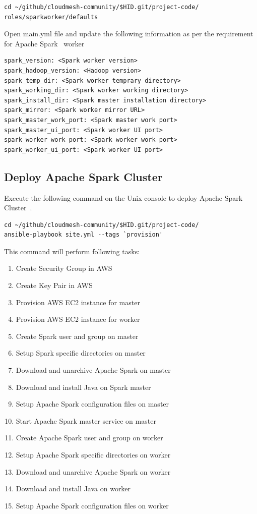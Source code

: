 \begin{verbatim}
cd ~/github/cloudmesh-community/$HID.git/project-code/
roles/sparkworker/defaults
\end{verbatim}

Open main.yml file and update the following information as per the
requirement for Apache Spark~\cite{hid-sp18-511-www-spark} worker

\begin{verbatim}
spark_version: <Spark worker version>
spark_hadoop_version: <Hadoop version>
spark_temp_dir: <Spark worker temprary directory>
spark_working_dir: <Spark worker working directory>
spark_install_dir: <Spark master installation directory>
spark_mirror: <Spark worker mirror URL>
spark_master_work_port: <Spark master work port>
spark_master_ui_port: <Spark worker UI port>
spark_worker_work_port: <Spark worker work port>
spark_worker_ui_port: <Spark worker UI port>
\end{verbatim}

\subsection{Deploy Apache Spark Cluster}\label{s:cluster-deployment}

Execute the following command on the Unix console to deploy Apache
Spark Cluster~\cite{hid-sp18-511-www-spark}.

\begin{verbatim}
cd ~/github/cloudmesh-community/$HID.git/project-code/
ansible-playbook site.yml --tags `provision'
\end{verbatim}

This command will perform following tasks:

\begin{enumerate}
	\item Create Security Group in AWS
	\item Create Key Pair in AWS
	\item Provision AWS EC2 instance for master
	\item Provision AWS EC2 instance for worker
	\item Create Spark user and group on master
	\item Setup Spark specific directories on master
	\item Download and unarchive Apache Spark on master
	\item Download and install Java on Spark master
	\item Setup Apache Spark configuration files on master
	\item Start Apache Spark master service on master
	\item Create Apache Spark user and group on worker
	\item Setup Apache Spark specific directories on worker
	\item Download and unarchive Apache Spark on worker
	\item Download and install Java  on worker
	\item Setup Apache Spark configuration files on worker
\end{enumerate}


